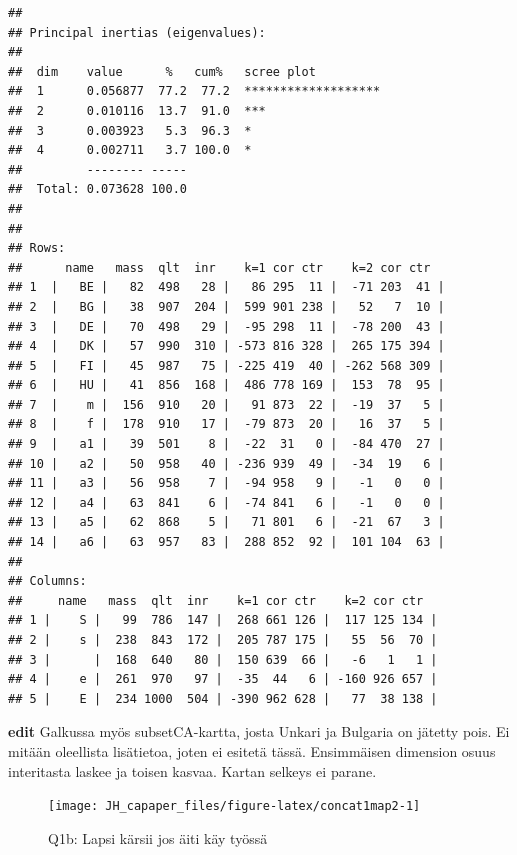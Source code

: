 \documentclass[
  finnish,
]{book}
\begin{document}
\begin{verbatim}
## 
## Principal inertias (eigenvalues):
## 
##  dim    value      %   cum%   scree plot               
##  1      0.056877  77.2  77.2  *******************      
##  2      0.010116  13.7  91.0  ***                      
##  3      0.003923   5.3  96.3  *                        
##  4      0.002711   3.7 100.0  *                        
##         -------- -----                                 
##  Total: 0.073628 100.0                                 
## 
## 
## Rows:
##      name   mass  qlt  inr    k=1 cor ctr    k=2 cor ctr  
## 1  |   BE |   82  498   28 |   86 295  11 |  -71 203  41 |
## 2  |   BG |   38  907  204 |  599 901 238 |   52   7  10 |
## 3  |   DE |   70  498   29 |  -95 298  11 |  -78 200  43 |
## 4  |   DK |   57  990  310 | -573 816 328 |  265 175 394 |
## 5  |   FI |   45  987   75 | -225 419  40 | -262 568 309 |
## 6  |   HU |   41  856  168 |  486 778 169 |  153  78  95 |
## 7  |    m |  156  910   20 |   91 873  22 |  -19  37   5 |
## 8  |    f |  178  910   17 |  -79 873  20 |   16  37   5 |
## 9  |   a1 |   39  501    8 |  -22  31   0 |  -84 470  27 |
## 10 |   a2 |   50  958   40 | -236 939  49 |  -34  19   6 |
## 11 |   a3 |   56  958    7 |  -94 958   9 |   -1   0   0 |
## 12 |   a4 |   63  841    6 |  -74 841   6 |   -1   0   0 |
## 13 |   a5 |   62  868    5 |   71 801   6 |  -21  67   3 |
## 14 |   a6 |   63  957   83 |  288 852  92 |  101 104  63 |
## 
## Columns:
##     name   mass  qlt  inr    k=1 cor ctr    k=2 cor ctr  
## 1 |    S |   99  786  147 |  268 661 126 |  117 125 134 |
## 2 |    s |  238  843  172 |  205 787 175 |   55  56  70 |
## 3 |      |  168  640   80 |  150 639  66 |   -6   1   1 |
## 4 |    e |  261  970   97 |  -35  44   6 | -160 926 657 |
## 5 |    E |  234 1000  504 | -390 962 628 |   77  38 138 |
\end{verbatim}

\textbf{edit} Galkussa myös subsetCA-kartta, josta Unkari ja Bulgaria on
jätetty pois. Ei mitään oleellista lisätietoa, joten ei esitetä tässä.
Ensimmäisen dimension osuus interitasta laskee ja toisen kasvaa. Kartan
selkeys ei parane.

\begin{figure}

{\centering \texttt{[image: JH\_capaper\_files/figure-latex/concat1map2-1]} 

}

\caption{Q1b: Lapsi kärsii jos äiti käy työssä}\label{fig:concat1map2}
\end{figure}
\end{document}
